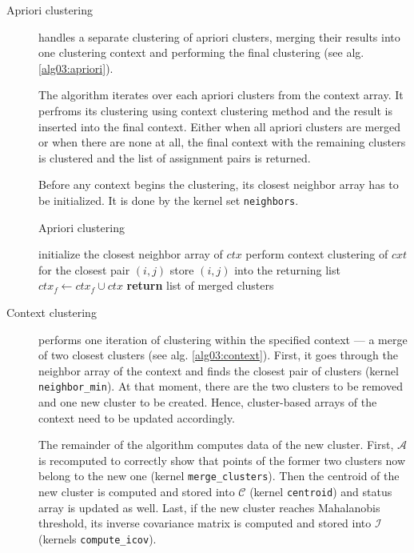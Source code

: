 \begin{description}
	\item[Apriori clustering] handles a separate clustering of apriori clusters, merging their results into one clustering context and performing the final clustering (see alg. \ref{alg03:apriori}).
	
	The algorithm iterates over each apriori clusters from the context array. It perfroms its clustering using context clustering method and the result is inserted into the final context. Either when all apriori clusters are merged or when there are none at all, the final context with the remaining clusters is clustered and the list of assignment pairs is returned.
	
	Before any context begins the clustering, its closest neighbor array has to be initialized. It is done by the kernel set \texttt{neighbors}.
	
	
	\begin{algorithm}
		\caption{Apriori clustering}
		\label{alg03:apriori}
		\begin{algorithmic}[1]
			 
			\State initialize the closest neighbor array of $ctx$ 
			\State perform context clustering of $cxt$ for the closest pair $(i,j)$ 
			\State store $(i,j)$ into the returning list
			\EndWhile
			\State $ctx_f \gets ctx_f \cup ctx$ 
			\EndFor
			\State \textbf{return} list of merged clusters
			\EndProcedure
		\end{algorithmic}
	\end{algorithm}

	\item[Context clustering] performs one iteration of clustering within the specified context --- a merge of two closest clusters (see alg. \ref{alg03:context}). First, it goes through the neighbor array of the context and finds the closest pair of clusters (kernel \texttt{neighbor\_min}). At that moment, there are the two clusters to be removed and one new cluster to be created. Hence, cluster-based arrays of the context need to be updated accordingly.
	
	The remainder of the algorithm computes data of the new cluster. First, $\mathcal{A}$ is recomputed to correctly show that points of the former two clusters now belong to the new one (kernel \texttt{merge\_clusters}). Then the centroid of the new cluster is computed and stored into $\mathcal{C}$ (kernel \texttt{centroid}) and status array is updated as well. Last, if the new cluster reaches Mahalanobis threshold, its inverse covariance matrix is computed and stored into $\mathcal{I}$ (kernels \texttt{compute\_icov}). 
	

\end{description}
